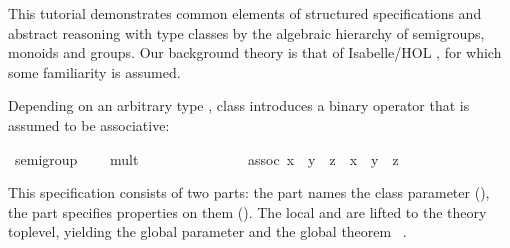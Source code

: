 \begin{isabellebody}
\begin{isamarkuptext}
  This tutorial demonstrates common elements of structured specifications
  and abstract reasoning with type classes by the algebraic hierarchy of
  semigroups, monoids and groups.  Our background theory is that of
  Isabelle/HOL \cite{isa-tutorial}, for which some
  familiarity is assumed.%
\end{isamarkuptext}%
\isamarkuptrue%
%
\isamarkuptrue%
%
\isamarkuptrue%
%
\begin{isamarkuptext}%
Depending on an arbitrary type \isa{{\isasymalpha}}, class  introduces a binary operator \isa{{\isacharparenleft}{\isasymotimes}{\isacharparenright}} that is
  assumed to be associative:%
\end{isamarkuptext}%
\isamarkuptrue%
%
\isadelimquote
%
\endisadelimquote
%
\isatagquote
{}\isamarkupfalse%
\ semigroup\ {\isacharequal}\isanewline
\ \ \ mult\ {\isacharcolon}{\isacharcolon}\ {\isachardoublequoteopen}{\isasymalpha}\ {\isasymRightarrow}\ {\isasymalpha}\ {\isasymRightarrow}\ {\isasymalpha}{\isachardoublequoteclose}\ \ \ \ {\isacharparenleft}\ {\isachardoublequoteopen}{\isasymotimes}{\isachardoublequoteclose}\ {}{}{\isacharparenright}\isanewline
\ \ \ assoc{\isacharcolon}\ {\isachardoublequoteopen}{\isacharparenleft}x\ {\isasymotimes}\ y{\isacharparenright}\ {\isasymotimes}\ z\ {\isacharequal}\ x\ {\isasymotimes}\ {\isacharparenleft}y\ {\isasymotimes}\ z{\isacharparenright}{\isachardoublequoteclose}%
\endisatagquote
{\isafoldquote}%
%
\isadelimquote
%
\endisadelimquote
%
\begin{isamarkuptext}%
\noindent This \hyperlink{command.class}{\mbox{}} specification consists of two
  parts: the  part names the class parameter
  (\hyperlink{element.fixes}{\mbox{}}), the  part specifies properties on them
  (\hyperlink{element.assumes}{\mbox{}}).  The local \hyperlink{element.fixes}{\mbox{}} and
  \hyperlink{element.assumes}{\mbox{}} are lifted to the theory toplevel,
  yielding the global
  parameter  and the
  global theorem \hyperlink{fact.semigroup.assoc:}{\mbox{}}~.%

\end{isamarkuptext}
\end{isabellebody}
